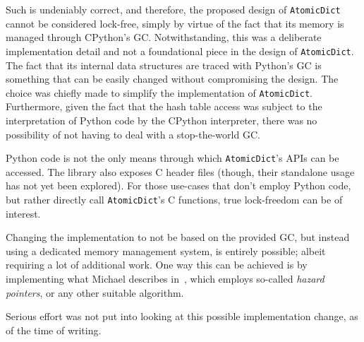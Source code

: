 Such is undeniably correct, and therefore, the proposed design of \texttt{Atomic\-Dict} cannot be considered lock-free, simply by virtue of the fact that its memory is managed through CPython's GC.
Notwithstanding, this was a deliberate implementation detail and not a foundational piece in the design of \texttt{AtomicDict}.
The fact that its internal data structures are traced with Python's GC is something that can be easily changed without compromising the design.
The choice was chiefly made to simplify the implementation of \texttt{AtomicDict}.
Furthermore, given the fact that the hash table access was subject to the interpretation of Python code by the CPython interpreter, there was no possibility of not having to deal with a stop-the-world GC\@.

Python code is not the only means through which \texttt{AtomicDict}'s APIs can be accessed.
The library also exposes C header files (though, their standalone usage has not yet been explored).
For those use-cases that don't employ Python code, but rather directly call \texttt{AtomicDict}'s C functions, true lock-freedom can be of interest.

Changing the implementation to not be based on the provided GC, but instead using a dedicated memory management system, is entirely possible; albeit requiring a lot of additional work.
One way this can be achieved is by implementing what Michael describes in~\cite{michael-safe-reclamation}, which employs so-called \emph{hazard pointers}, or any other suitable algorithm.

Serious effort was not put into looking at this possible implementation change, as of the time of writing.

